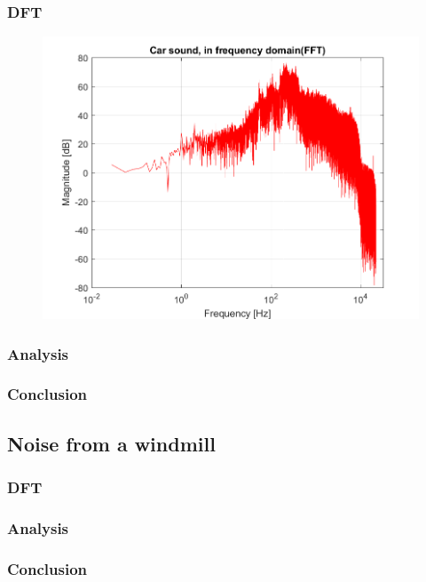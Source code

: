 \subsubsection{DFT}
\begin{figure}
	\centering
	\includegraphics[width=\textwidth]{code/Car_figure2.png}
	\caption{}
	\label{fig:Car_figure2:2}
\end{figure}




\subsubsection{Analysis}



\subsubsection{Conclusion}

\subsection{Noise from a windmill}
\subsubsection{DFT}

\subsubsection{Analysis}

\subsubsection{Conclusion}


